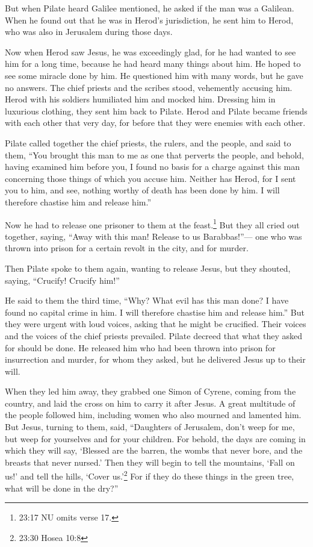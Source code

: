  But when Pilate heard Galilee mentioned, he asked if the
man was a Galilean.  When he found out that he was in
Herod's jurisdiction, he sent him to Herod, who was also in Jerusalem
during those days.

 Now when Herod saw Jesus, he was exceedingly glad, for he
had wanted to see him for a long time, because he had heard many things
about him. He hoped to see some miracle done by him.  He
questioned him with many words, but he gave no answers. 
The chief priests and the scribes stood, vehemently accusing him.
 Herod with his soldiers humiliated him and mocked him.
Dressing him in luxurious clothing, they sent him back to Pilate.
 Herod and Pilate became friends with each other that very
day, for before that they were enemies with each other.

 Pilate called together the chief priests, the rulers, and
the people,  and said to them, ``You brought this man to me
as one that perverts the people, and behold, having examined him before
you, I found no basis for a charge against this man concerning those
things of which you accuse him.  Neither has Herod, for I
sent you to him, and see, nothing worthy of death has been done by him.
 I will therefore chastise him and release him.''

 Now he had to release one prisoner to them at the
feast.\footnote{23:17 NU omits verse 17.}  But they all
cried out together, saying, ``Away with this man! Release to us
Barabbas!''---  one who was thrown into prison for a
certain revolt in the city, and for murder.

 Then Pilate spoke to them again, wanting to release Jesus,
 but they shouted, saying, ``Crucify! Crucify him!''

 He said to them the third time, ``Why? What evil has this
man done? I have found no capital crime in him. I will therefore
chastise him and release him.''  But they were urgent with
loud voices, asking that he might be crucified. Their voices and the
voices of the chief priests prevailed.  Pilate decreed that
what they asked for should be done.  He released him who
had been thrown into prison for insurrection and murder, for whom they
asked, but he delivered Jesus up to their will.

 When they led him away, they grabbed one Simon of Cyrene,
coming from the country, and laid the cross on him to carry it after
Jesus.  A great multitude of the people followed him,
including women who also mourned and lamented him.  But
Jesus, turning to them, said, ``Daughters of Jerusalem, don't weep for
me, but weep for yourselves and for your children.  For
behold, the days are coming in which they will say, `Blessed are the
barren, the wombs that never bore, and the breasts that never nursed.'
 Then they will begin to tell the mountains, `Fall on us!'
and tell the hills, `Cover us.'\footnote{23:30 Hosea 10:8} 
For if they do these things in the green tree, what will be done in the
dry?''

